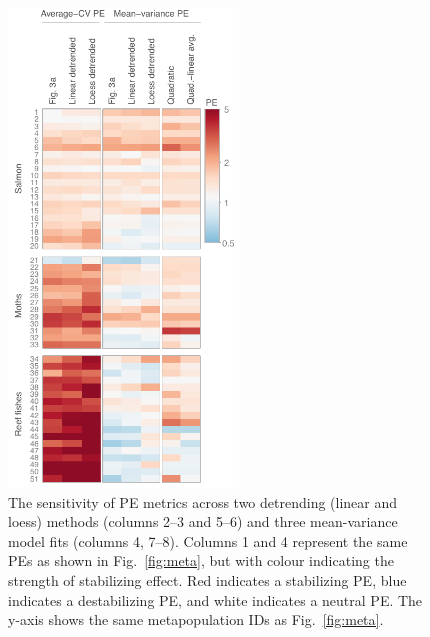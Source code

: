 %
\clearpage
\begin{figure}[htbp]
  \centering \includegraphics[height=5in]{prophets/fig4}
  \caption{
  The sensitivity of PE metrics across two detrending (linear and
    loess) methods (columns 2--3 and 5--6) and three mean-variance model fits
    (columns 4, 7--8). Columns 1 and 4 represent the same PEs as shown in
    Fig.~\ref{fig:meta}, but with colour indicating the strength of stabilizing
    effect. Red indicates a stabilizing PE, blue indicates a destabilizing PE,
    and white indicates a neutral PE. The y-axis shows the same metapopulation
    IDs as Fig.~\ref{fig:meta}.
  }
  \label{fig:detrend}
\end{figure}

